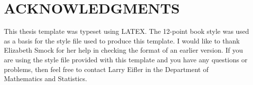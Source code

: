 %    



\chapter*{ACKNOWLEDGMENTS}

    This thesis template was typeset using LATEX.
The 12-point book style was used as a basis for the style file used 
to produce this template. I would like to thank Elizabeth Smock for
her help in checking the format of an earlier version.
If you are using the style file provided with this template and you
have any questions or problems, then feel free to contact Larry Eifler
in the Department of Mathematics and Statistics. 

\clearpage


\endinput
